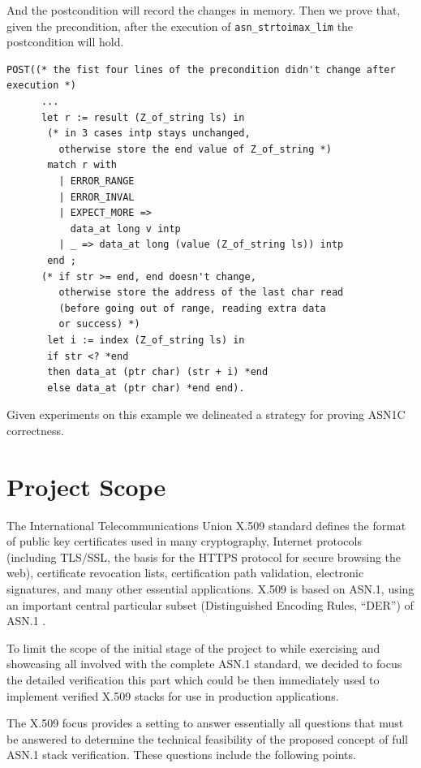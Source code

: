 \documentclass[acmsmall,nonacm]{acmart}
\begin{document}
And the postcondition will record the changes in memory. Then we prove that, given the precondition, after the execution of \texttt{asn\_strtoimax\_lim} the postcondition will hold.
           
\begin{lstlisting}[language=Coq]
 POST((* the fist four lines of the precondition didn't change after execution *)
      ... 
      let r := result (Z_of_string ls) in
       (* in 3 cases intp stays unchanged,
         otherwise store the end value of Z_of_string *)
       match r with 
         | ERROR_RANGE 
         | ERROR_INVAL 
         | EXPECT_MORE => 
           data_at long v intp
         | _ => data_at long (value (Z_of_string ls)) intp 
       end ;
      (* if str >= end, end doesn't change, 
         otherwise store the address of the last char read 
         (before going out of range, reading extra data 
         or success) *)
       let i := index (Z_of_string ls) in
       if str <? *end
       then data_at (ptr char) (str + i) *end
       else data_at (ptr char) *end end).
\end{lstlisting}

Given experiments on this example we delineated a strategy for proving
ASN1C correctness.

\section{Project Scope}

The International Telecommunications Union X.509 standard
\cite{X509} defines the format of public key certificates used in
many cryptography, Internet protocols (including TLS/SSL, the basis
for the HTTPS protocol for secure browsing the web), certificate
revocation lists, certification path validation, electronic
signatures, and many other essential applications. X.509 is based on
ASN.1, using an important central particular subset (Distinguished
Encoding Rules, ``DER'') of ASN.1 \cite{BERandDER}.

To limit the scope of the initial stage of the project to while
exercising and showcasing all involved with the complete ASN.1
standard, we decided to focus the detailed verification this part
which could be then immediately used to implement verified X.509
stacks for use in production applications.
 
The X.509 focus provides a setting to answer essentially all questions
that must be answered to determine the technical feasibility of the
proposed concept of full ASN.1 stack verification. These questions
include the following points.
\end{document}
